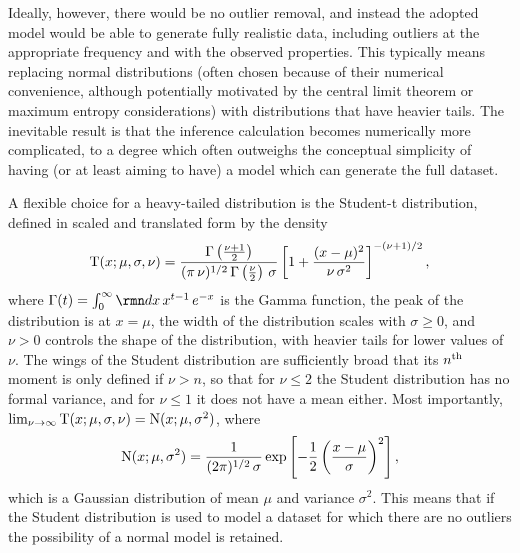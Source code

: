 \documentclass[a4paper,fleqn,usenatbib]{mnras}
\begin{document}
{Ideally, however, there would be no outlier removal, and instead
the adopted model would be able to generate fully realistic data,
including outliers at the appropriate frequency and 
with the observed properties.
This typically means replacing normal distributions 
(often chosen because of their numerical convenience,
although potentially motivated by the central limit theorem
or maximum entropy considerations) 
with distributions that have heavier tails.
The inevitable result is that the inference calculation becomes 
numerically more complicated, 
to a degree which often outweighs the conceptual simplicity of 
having (or at least aiming to have) a model which can generate the 
full dataset.

A flexible choice for a heavy-tailed distribution
is the Student-t distribution, defined 
in scaled and translated form by the density 
\begin{equation}
\label{equation:student}
{\rm T}(x; \mu, \sigma, \nu)
  = \frac{\Gamma\left(\frac{\nu + 1}{2}\right)}
    {(\pi \, \nu)^{1/2} \, \Gamma\left(\frac{\nu}{2}\right) \, \sigma}
    \left[1 + \frac{(x - \mu)^2}{\nu \, \sigma^2} \right]^{-(\nu + 1)/2},
\end{equation}
where 
$\Gamma(t) = \int_0^\infty \diff x \, x^{t - 1} \, e^{-x}$ is the 
Gamma function,
the peak of the distribution is at $x = \mu$,
the width of the distribution scales with $\sigma \geq 0$,
and $\nu > 0$ controls the shape of the distribution,
with heavier tails for lower values of $\nu$.
The wings of the Student distribution are sufficiently broad that its
$n^{\rm th}$ moment is only defined if $\nu > n$, so that
for $\nu \leq 2$ the Student distribution has no formal variance,
and for $\nu \leq 1$ it does not have a mean either.
Most importantly,
$\lim_{\nu \rightarrow \infty} 
{\rm T}(x; \mu, \sigma, \nu) = {\rm N}(x ; \mu, \sigma^2)$,
where 
\begin{equation}
\label{equation:normal}
{\rm N}(x ; \mu, \sigma^2)
  =
  \frac{1}{(2 \pi)^{1/2} \, \sigma}
  \exp \left[ -\frac{1}{2}
  \left( \frac{x - \mu}{\sigma} \right)^2
  \right],
\end{equation}
which is a Gaussian distribution of mean $\mu$ and variance $\sigma^2$.
This means that if the Student distribution is used to model a dataset
for which there are no outliers the possibility of a normal model
is retained.

}
\end{document}
